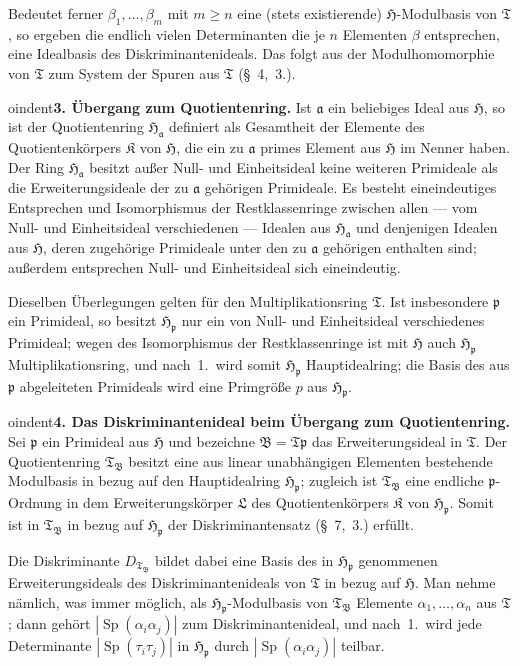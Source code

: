 \documentclass[12pt,a4paper]{article}
\newcommand{\ideala}{\mathfrak{a}}
\newcommand{\idealp}{\mathfrak{p}}
\newcommand{\HH}{\mathfrak{H}}          %
\DeclareMathOperator{\Sp}{Sp}           %
\newcommand{\TT}{\mathfrak{T}}          %
\theoremstyle{definition}
\begin{document}
Bedeutet ferner $\beta_1,\dots,\beta_m$ mit $m \geq n$ eine (stets
existierende) $\HH$-Modulbasis von $\TT$, so ergeben die endlich vielen
Determinanten die je $n$ Elementen $\beta$ entsprechen, eine Idealbasis des
Diskriminantenideals. Das folgt aus der Modulhomomorphie von $\TT$ zum
System der Spuren aus $\TT$ (\S~4,~3.).

\medskip



oindent\textbf{3. \"Ubergang zum Quotientenring.} Ist $\ideala$ ein
beliebiges Ideal aus $\HH$, so ist der Quotientenring $\HH_{\ideala}$
definiert als Gesamtheit der Elemente des Quotientenk\"orpers
$\mathfrak{K}$ von $\HH$, die ein zu $\ideala$ primes Element aus $\HH$ im
Nenner haben. Der Ring $\HH_{\ideala}$ besitzt au\ss er Null- und
Einheitsideal keine weiteren Primideale als die Erweiterungsideale der zu
$\ideala$ geh\"origen Primideale. Es besteht eineindeutiges Entsprechen
und Isomorphismus der Restklassenringe zwischen allen --- vom Null- und
Einheitsideal verschiedenen --- Idealen aus $\HH_{\ideala}$ und denjenigen
Idealen aus $\HH$, deren zugeh\"orige Primideale unter den zu $\ideala$
geh\"origen enthalten sind; au\ss erdem entsprechen Null- und Einheitsideal
sich eineindeutig.

Dieselben \"Uberlegungen gelten f\"ur den Multiplikationsring $\TT$. Ist
insbesondere $\idealp$ ein Primideal, so besitzt $\HH_{\idealp}$ nur ein von
Null- und Einheitsideal verschiedenes Primideal; wegen des Isomorphismus
der Restklassenringe ist mit $\HH$ auch $\HH_{\idealp}$ Multiplikationsring,
und nach~1.\ wird somit $\HH_{\idealp}$ Hauptidealring; die Basis des aus
$\idealp$ abgeleiteten Primideals wird eine Primgr\"o\ss e $p$ aus
$\HH_{\idealp}$.

\medskip



oindent\textbf{4. Das Diskriminantenideal beim \"Ubergang zum
Quotientenring.} Sei $\idealp$ ein Primideal aus $\HH$ und bezeichne
$\mathfrak{B} = \TT\idealp$ das Erweiterungsideal in $\TT$. Der
Quotientenring $\TT_{\mathfrak{B}}$ besitzt eine aus linear unabh\"angigen
Elementen bestehende Modulbasis in bezug auf den Hauptidealring
$\HH_{\idealp}$; zugleich ist $\TT_{\mathfrak{B}}$ eine endliche
$\idealp$-Ordnung in dem Erweiterungsk\"orper $\mathfrak{L}$ des
Quotientenk\"orpers $\mathfrak{K}$ von $\HH_{\idealp}$. Somit ist in
$\TT_{\mathfrak{B}}$ in bezug auf $\HH_{\idealp}$ der Diskriminantensatz
(\S~7,~3.) erf\"ullt.

Die Diskriminante $D_{\TT_{\mathfrak{B}}}$ bildet dabei eine Basis des in
$\HH_{\idealp}$ genommenen Erweiterungsideals des Diskriminantenideals von
$\TT$ in bezug auf $\HH$. Man nehme n\"amlich, was immer m\"oglich, als
$\HH_{\idealp}$-Modulbasis von $\TT_{\mathfrak{B}}$ Elemente
$\alpha_1,\dots,\alpha_n$ aus $\TT$; dann geh\"ort
$|\Sp(\alpha_i\alpha_j)|$ zum Diskriminantenideal, und nach~1.\ wird jede
Determinante $|\Sp(\tau_i\tau_j)|$ in $\HH_{\idealp}$ durch
$|\Sp(\alpha_i\alpha_j)|$ teilbar.
\end{document}
